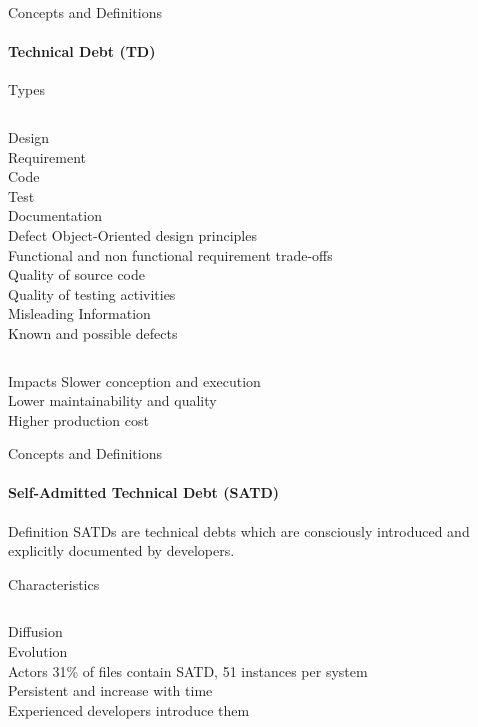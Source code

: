 \documentclass{beamer}
\begin{document}
\begin{darkframes}
				\begin{frame}{Concepts and Definitions}	
					\framesubtitle{Technical Debt (TD)}	
					\begin{exampleblock}{Types}
						\vspace{1mm}
						\begin{columns}[onlytextwidth]
							\small 
							Design\\
							Requirement\\
							Code\\
							Test\\
							Documentation\\
							Defect
							\small
							\alert{Object-Oriented design principles} \\
							\alert{Functional and non functional requirement trade-offs}\\
							\alert{Quality of source code}\\
							\alert{Quality of testing activities}\\
							\alert{Misleading Information}\\
							\alert{Known and possible defects}
						\end{columns}
					\end{exampleblock}	
					\begin{exampleblock}{Impacts}
						Slower conception and execution\\
						Lower maintainability and quality\\
						Higher production cost
					\end{exampleblock}	
				\end{frame}
			
				\begin{frame}{Concepts and Definitions}	
					\framesubtitle{Self-Admitted Technical Debt (SATD)}	
					\begin{block}{Definition}
						SATDs are technical debts which are consciously introduced and explicitly documented by developers.
					\end{block}
					\begin{block}{Characteristics}
						\vspace{1mm}
						\begin{columns}[onlytextwidth]
							Diffusion\\
							Evolution\\
							Actors
							\alert{31\% of files contain SATD, 51 instances per system}\\
							\alert{Persistent and increase with time}\\
							\alert{Experienced developers introduce them}
						\end{columns}
					\end{block}
				\end{frame}
			

\end{darkframes}
\end{document}
